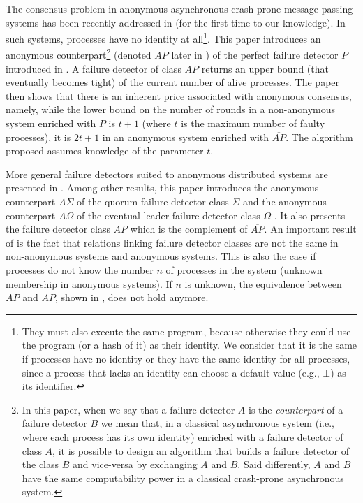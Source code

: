 \documentclass[10pt, conference, compsocconf]{IEEEtran}
\newcommand{\AP}{{ \mathit{AP}}}
\newcommand{\NAP}{{ \overline{\mathit{AP}}}}
\begin{document}
The consensus problem in anonymous asynchronous crash-prone message-passing 
systems  has been  recently addressed  in \cite{DBLP:conf/wdag/BonnetR09} 
(for the first time to our knowledge).  
In such systems, processes have no identity at 
all\footnote{They must also execute the same program, 
because otherwise they could use the program
(or a hash of it) as their identity. 
We consider that it is the same if processes have no identity 
or they have the same identity for all processes, 
since a process that lacks an identity can choose
a default value (e.g., $\bot$) as its identifier.}.
This paper introduces an  anonymous counterpart\footnote{In this paper,
when we say that a failure detector $A$ is the  {\it counterpart} 
of  a  failure   detector  $B$  we  mean  that,   in  a classical  
asynchronous system  (i.e., where each process  has its own identity) 
enriched    with  a  failure  detector of  class $A$,  it  is  possible  to
design  an  algorithm that builds  a failure detector  of the class  $B$
and vice-versa  by exchanging  $A$ and $B$.  Said differently, $A$  and $B$
have the same computability power in a classical crash-prone asynchronous 
system.}  (denoted $\NAP$ later in \cite{DBLP:conf/wdag/BonnetR10})  
of  the   perfect  failure detector  $P$
introduced in \cite{DBLP:journals/jacm/ChandraT96}. A failure detector
of class $\NAP$ returns an upper bound (that eventually becomes tight)
of the current number of alive processes. The paper then
shows that  there  is  an inherent  price  associated with anonymous
consensus,  namely,  while the lower bound on the number of rounds in 
a non-anonymous system enriched with $P$  is $t+1$ (where $t$ is 
the maximum number of faulty processes), it is $2t+1$  
in an anonymous system enriched with  $\NAP$.
The algorithm proposed assumes knowledge of the parameter $t$.

More general failure detectors suited to anonymous  distributed systems are
presented in \cite{DBLP:conf/wdag/BonnetR10}. 
Among other results,  this paper introduces the anonymous counterpart $A\Sigma$
of the quorum  failure detector  class 
$\Sigma$ \cite{DBLP:journals/jacm/Delporte-GalletFG10} and the 
anonymous counterpart $A\Omega$ of the eventual leader  failure detector 
class $\Omega$ \cite{DBLP:journals/jacm/ChandraHT96}. It also presents
the failure detector class $\AP$ which is the complement of $\NAP$.
An important result of \cite{DBLP:conf/wdag/BonnetR10} 
is the fact that  relations linking  failure detector classes 
are  not the same in non-anonymous systems   and anonymous systems. 
This is also the case
if processes do not know the number $n$ of processes in the system 
(unknown membership in anonymous systems). 
If $n$ is unknown, the equivalence between
$\mathit{AP}$ and $\overline{\mathit{AP}}$, 
shown in \cite{DBLP:conf/wdag/BonnetR10}, does not hold anymore.
\end{document}
